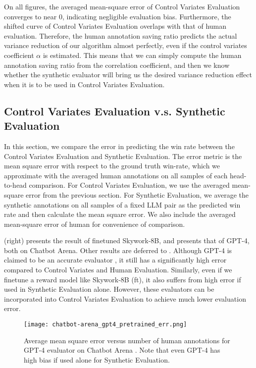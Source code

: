 On all figures,
the averaged mean-square error of Control Variates Evaluation converges to near 0, indicating negligible evaluation bias. Furthermore, the shifted curve of Control Variates Evaluation overlaps with that of human evaluation. Therefore, the human annotation saving ratio predicts the actual variance reduction of our algorithm almost perfectly, even if the control variates coefficient $\alpha$ is estimated. This means that we can simply compute the human annotation saving ratio from the correlation coefficient, and then we know whether the synthetic evaluator will bring us the desired variance reduction effect when it is to be used in Control Variates Evaluation.

\subsection{Control Variates Evaluation v.s. Synthetic Evaluation}
\label{sec:bootstrap}
In this section, we compare the error in predicting the win rate between the Control Variates Evaluation and Synthetic Evaluation. The error metric is the mean square error with respect to the ground truth win-rate, which we approximate with the averaged human annotations on all samples of each head-to-head comparison. For Control Variates Evaluation, we use the averaged mean-square error from the previous section. For Synthetic Evaluation, we average the synthetic annotations on all samples of a fixed LLM pair as the predicted win rate and then calculate the mean square error. We also include the averaged mean-square error of human for convenience of comparison. 

 (right) presents the result of finetuned Skywork-8B, and  presents that of GPT-4, both on Chatbot Arena. Other results are deferred to . Although GPT-4 is claimed to be an accurate evaluator \citep{zheng2023judging}, it still has a significantly high error compared to Control Variates and Human Evaluation.
Similarly, even if we finetune a reward model like Skywork-8B (ft), it also suffers from high error if used in Synthetic Evaluation alone. However, these evaluators can be incorporated into Control Variates Evaluation to achieve much lower evaluation error. \loose

\begin{figure}[t]
    \centering
    \texttt{[image: chatbot-arena\_gpt4\_pretrained\_err.png]}
    \caption{Average mean square error versus number of human annotations for GPT-4 evaluator on Chatbot Arena \citep{zheng2023judging}. Note that even GPT-4 has high bias if used alone for Synthetic Evaluation.}
    \label{fig:bootstrap_err}
\end{figure}


